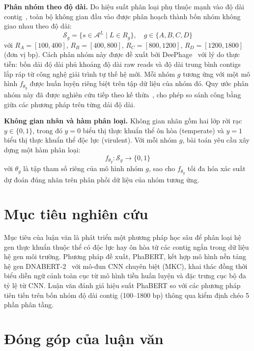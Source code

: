 \textbf{Phân nhóm theo độ dài.} Do hiệu suất phân loại phụ thuộc mạnh vào độ dài contig~\cite{wu2021deephage,shang2023phatyp}, toàn bộ không gian đầu vào được phân hoạch thành bốn nhóm không giao nhau theo độ dài:
\begin{equation}
    \mathcal{S}_g = \{s \in \mathcal{A}^L \mid L \in R_g\}, \quad g \in \{A, B, C, D\}
    \label{eq:length_groups}
\end{equation}
với $R_A = [100, 400]$, $R_B = [400, 800]$, $R_C = [800, 1200]$, $R_D = [1200, 1800]$ (đơn vị bp). Cách phân nhóm này được đề xuất bởi DeePhage~\cite{wu2021deephage} với lý do thực tiễn: bốn dải độ dài phủ khoảng độ dài raw reads và độ dài trung bình contigs lắp ráp từ công nghệ giải trình tự thế hệ mới. Mỗi nhóm $g$ tương ứng với một mô hình $f_{\theta_g}$ được huấn luyện riêng biệt trên tập dữ liệu của nhóm đó. Quy ước phân nhóm này đã được nghiên cứu tiếp theo kế thừa~\cite{shang2023phatyp}, cho phép so sánh công bằng giữa các phương pháp trên từng dải độ dài.

\textbf{Không gian nhãn và hàm phân loại.} Không gian nhãn gồm hai lớp rời rạc $y \in \{0, 1\}$, trong đó $y = 0$ biểu thị thực khuẩn thể ôn hòa (temperate) và $y = 1$ biểu thị thực khuẩn thể độc lực (virulent). Với mỗi nhóm $g$, bài toán yêu cầu xây dựng một hàm phân loại:
\begin{equation}
    f_{\theta_g}: \mathcal{S}_g \rightarrow \{0, 1\}
    \label{eq:classification_func}
\end{equation}
với $\theta_g$ là tập tham số riêng của mô hình nhóm $g$, sao cho $f_{\theta_g}$ tối đa hóa xác suất dự đoán đúng nhãn trên phân phối dữ liệu của nhóm tương ứng.

\section{Mục tiêu nghiên cứu}
\label{sec:objectives}

Mục tiêu của luận văn là phát triển một phương pháp học sâu để phân loại hệ gen thực khuẩn thuộc thể có độc lực hay ôn hòa từ các contig ngắn trong dữ liệu hệ gen môi trường. Phương pháp đề xuất, PhaBERT, kết hợp mô hình nền tảng hệ gen DNABERT-2~\cite{zhou2023dnabert} với mô-đun CNN chuyên biệt (MKC), khai thác đồng thời biểu diễn ngữ cảnh toàn cục từ mô hình tiền huấn luyện và đặc trưng cục bộ đa tỷ lệ từ CNN. Luận văn đánh giá hiệu suất PhaBERT so với các phương pháp tiên tiến trên bốn nhóm độ dài contig (100--1800 bp) thông qua kiểm định chéo 5 phần phân tầng.

\section{Đóng góp của luận văn}
\label{sec:contributions}

